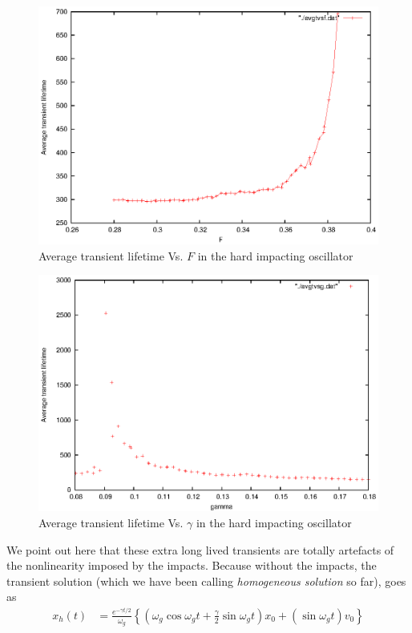 \documentclass{book}
\renewcommand{\(}{\begin{columns}}
\renewcommand{\)}{\end{columns}}
\newcommand{\<}[1]{\begin{column}{#1}}
\renewcommand{\>}{\end{column}}
\begin{document}
\begin{figure}[!htb]
\caption{Average transient lifetime Vs.  $F$ in the hard impacting oscillator}
\label{fig-tvsf}
\begin{center}
\includegraphics[width=0.7\columnwidth]{avgtauvsf-wofit}
\end{center}
\end{figure}

\begin{figure}[!htp]
\caption{Average transient lifetime Vs.  $\gamma$ in the hard impacting oscillator}
\label{fig-tvsg}
\begin{center}
\includegraphics[width=0.7\columnwidth]{avgtauvsg-wofit}
\end{center}
\end{figure}

We point out here that these extra long lived transients are totally artefacts 
of the nonlinearity imposed by the impacts.  Because without the impacts, the 
transient solution (which we have been calling \emph{homogeneous solution} so 
far), goes as 
\begin{align}
x_h(t)&=\frac{e^{-\gamma t/2}}{\omega_g}\left\{(\omega_g\cos{\omega_gt}+\frac{\gamma}{2}\sin{\omega_gt})x_0 + (\sin{\omega_gt})v_0 \right\}
\end{align}
\end{document}
